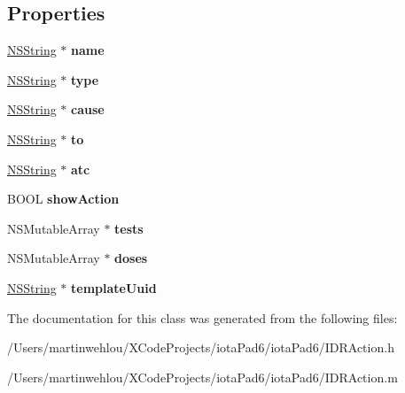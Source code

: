 \subsection*{Properties}
\begin{DoxyCompactItemize}
\item 
\hypertarget{interface_i_d_r_action_a3c0c4c8d45ae654fc9a16672b283d29a}{
\hyperlink{class_n_s_string}{NSString} $\ast$ {\bfseries name}}
\label{interface_i_d_r_action_a3c0c4c8d45ae654fc9a16672b283d29a}

\item 
\hypertarget{interface_i_d_r_action_a40c5243fc2d7b618cdbea4fc8348712a}{
\hyperlink{class_n_s_string}{NSString} $\ast$ {\bfseries type}}
\label{interface_i_d_r_action_a40c5243fc2d7b618cdbea4fc8348712a}

\item 
\hypertarget{interface_i_d_r_action_af22cfd979c55114d4a22e34fe05d8a92}{
\hyperlink{class_n_s_string}{NSString} $\ast$ {\bfseries cause}}
\label{interface_i_d_r_action_af22cfd979c55114d4a22e34fe05d8a92}

\item 
\hypertarget{interface_i_d_r_action_aaedbc54ac969d5af3944cc68df18f331}{
\hyperlink{class_n_s_string}{NSString} $\ast$ {\bfseries to}}
\label{interface_i_d_r_action_aaedbc54ac969d5af3944cc68df18f331}

\item 
\hypertarget{interface_i_d_r_action_a639566425ad01068c3fd3687c4604460}{
\hyperlink{class_n_s_string}{NSString} $\ast$ {\bfseries atc}}
\label{interface_i_d_r_action_a639566425ad01068c3fd3687c4604460}

\item 
\hypertarget{interface_i_d_r_action_a9fa7be443e90e9c6a393e2c915cf98b6}{
BOOL {\bfseries showAction}}
\label{interface_i_d_r_action_a9fa7be443e90e9c6a393e2c915cf98b6}

\item 
\hypertarget{interface_i_d_r_action_a0973b8d89489a74c1a6707e346d69325}{
NSMutableArray $\ast$ {\bfseries tests}}
\label{interface_i_d_r_action_a0973b8d89489a74c1a6707e346d69325}

\item 
\hypertarget{interface_i_d_r_action_af60831d3515cf69697996430a7c70be2}{
NSMutableArray $\ast$ {\bfseries doses}}
\label{interface_i_d_r_action_af60831d3515cf69697996430a7c70be2}

\item 
\hypertarget{interface_i_d_r_action_aaf93800e864996a30bd0ec5a47007e4d}{
\hyperlink{class_n_s_string}{NSString} $\ast$ {\bfseries templateUuid}}
\label{interface_i_d_r_action_aaf93800e864996a30bd0ec5a47007e4d}

\end{DoxyCompactItemize}


The documentation for this class was generated from the following files:\begin{DoxyCompactItemize}
\item 
/Users/martinwehlou/XCodeProjects/iotaPad6/iotaPad6/IDRAction.h\item 
/Users/martinwehlou/XCodeProjects/iotaPad6/iotaPad6/IDRAction.m\end{DoxyCompactItemize}
